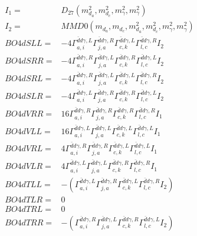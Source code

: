 \documentclass[A4,landscape]{article}
\begin{document}
\begin{align} 
I_1 = & D_{27}(m^2_{d_{{a}}}, m^2_{d_{{c}}}, m^2_{\gamma}, m^2_{\gamma}) \\ 
I_2 = & MMD0(m_{d_{{a}}}, m_{d_{{c}}}, m^2_{d_{{a}}}, m^2_{d_{{c}}}, m^2_{\gamma}, m^2_{\gamma}) \\ 
  BO4dSLL= & -4  \Gamma^{\bar{d}d \gamma ,L}_{a, i} \Gamma^{\bar{d}d \gamma ,R}_{j, a} \Gamma^{\bar{d}d \gamma ,L}_{c, k} \Gamma^{\bar{d}d \gamma ,R}_{l, c} I_2 \\ 
  BO4dSRR= & -4  \Gamma^{\bar{d}d \gamma ,R}_{a, i} \Gamma^{\bar{d}d \gamma ,L}_{j, a} \Gamma^{\bar{d}d \gamma ,R}_{c, k} \Gamma^{\bar{d}d \gamma ,L}_{l, c} I_2 \\ 
  BO4dSRL= & -4  \Gamma^{\bar{d}d \gamma ,R}_{a, i} \Gamma^{\bar{d}d \gamma ,L}_{j, a} \Gamma^{\bar{d}d \gamma ,L}_{c, k} \Gamma^{\bar{d}d \gamma ,R}_{l, c} I_2 \\ 
  BO4dSLR= & -4  \Gamma^{\bar{d}d \gamma ,L}_{a, i} \Gamma^{\bar{d}d \gamma ,R}_{j, a} \Gamma^{\bar{d}d \gamma ,R}_{c, k} \Gamma^{\bar{d}d \gamma ,L}_{l, c} I_2 \\ 
  BO4dVRR= & 16  \Gamma^{\bar{d}d \gamma ,R}_{a, i} \Gamma^{\bar{d}d \gamma ,R}_{j, a} \Gamma^{\bar{d}d \gamma ,R}_{c, k} \Gamma^{\bar{d}d \gamma ,R}_{l, c} I_1 \\ 
  BO4dVLL= & 16  \Gamma^{\bar{d}d \gamma ,L}_{a, i} \Gamma^{\bar{d}d \gamma ,L}_{j, a} \Gamma^{\bar{d}d \gamma ,L}_{c, k} \Gamma^{\bar{d}d \gamma ,L}_{l, c} I_1 \\ 
  BO4dVRL= & 4  \Gamma^{\bar{d}d \gamma ,R}_{a, i} \Gamma^{\bar{d}d \gamma ,R}_{j, a} \Gamma^{\bar{d}d \gamma ,L}_{c, k} \Gamma^{\bar{d}d \gamma ,L}_{l, c} I_1 \\ 
  BO4dVLR= & 4  \Gamma^{\bar{d}d \gamma ,L}_{a, i} \Gamma^{\bar{d}d \gamma ,L}_{j, a} \Gamma^{\bar{d}d \gamma ,R}_{c, k} \Gamma^{\bar{d}d \gamma ,R}_{l, c} I_1 \\ 
  BO4dTLL= & -( \Gamma^{\bar{d}d \gamma ,L}_{a, i} \Gamma^{\bar{d}d \gamma ,R}_{j, a} \Gamma^{\bar{d}d \gamma ,L}_{c, k} \Gamma^{\bar{d}d \gamma ,R}_{l, c} I_2) \\ 
  BO4dTLR= & 0 \\ 
  BO4dTRL= & 0 \\ 
  BO4dTRR= & -( \Gamma^{\bar{d}d \gamma ,R}_{a, i} \Gamma^{\bar{d}d \gamma ,L}_{j, a} \Gamma^{\bar{d}d \gamma ,R}_{c, k} \Gamma^{\bar{d}d \gamma ,L}_{l, c} I_2) \\ 
\end{align} 
\end{document}
